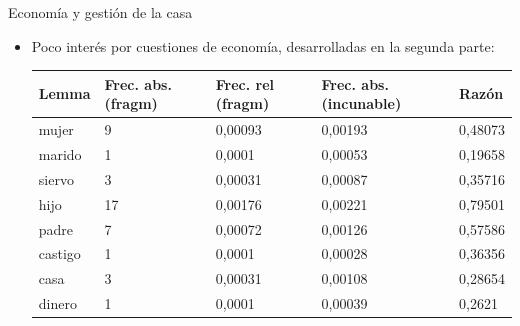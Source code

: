 \documentclass[11pt,aspectratio=169]{beamer}
\begin{document}
\begin{frame}{Economía y gestión de la casa}
\begin{center}
\begin{itemize}
\item Poco interés por cuestiones de economía, desarrolladas en la segunda parte:
\begin{table}[!ht]
    \centering
    \begin{tabular}{|l|l|l|l|l|}
    \hline
        \textbf{Lemma} & \textbf{Frec. abs. (fragm)} & \textbf{Frec. rel (fragm)} & \textbf{Frec. abs. (incunable)} & \textbf{Razón} \\ \hline
        mujer & 9 & 0,00093 & 0,00193 & 0,48073 \\ \hline
        marido & 1 & 0,0001 & 0,00053 & 0,19658 \\ \hline
        siervo & 3 & 0,00031 & 0,00087 & 0,35716 \\ \hline
        hijo & 17 & 0,00176 & 0,00221 & 0,79501 \\ \hline
        padre & 7 & 0,00072 & 0,00126 & 0,57586 \\ \hline
        castigo & 1 & 0,0001 & 0,00028 & 0,36356 \\ \hline
        casa & 3 & 0,00031 & 0,00108 & 0,28654 \\ \hline
        dinero & 1 & 0,0001 & 0,00039 & 0,2621 \\ \hline
    \end{tabular}
\end{table}
\end{itemize}

\end{center}
\end{frame}
\end{document}
